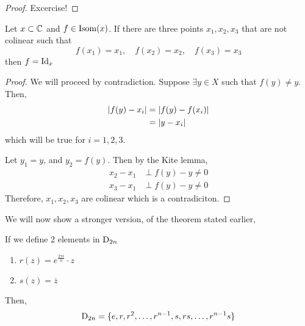 \documentclass{article}
\begin{document}
\begin{proof}
    Excercise!
\end{proof}

\begin{lemma}
    Let $x \subset \mathbb{C}$ and $f \in \operatorname{Isom}(x)$. If there are three points $x_1, x_2, x_3$ that are not colinear such that
    \[
        f(x_1) = x_1, \quad f(x_2) = x_2, \quad f(x_3) = x_3  
    \]
    then $f = \mathrm{Id}_x$
\end{lemma}
\begin{proof}
    We will proceed by contradiction. Suppose $\exists y \in X$ such that $f(y) \neq y$. Then,
    \begin{align*}
        \left\lvert f(y) - x_i\right\rvert &= \left\lvert f(y) - f(x_i)\right\rvert \\
        &= \left\lvert y - x_i\right\rvert
    \end{align*}
    which will be true for $i = 1, 2, 3$.

    Let $y_1 = y$, and $y_2 = f(y)$. Then by the Kite lemma,
    \begin{align*}
        x_2 - x_1 &\perp f(y) - y \neq 0 \\
        x_3 - x_1 &\perp f(y) - y \neq 0
    \end{align*}
    Therefore, $x_1, x_2, x_3$ are colinear which is a contradiciton. \contradiction
\end{proof}

We will now show a stronger version, of the theorem stated earlier,
\begin{thm}[$\abs{\D_{2n}} = 2n$]
    If we define 2 elements in $\mathrm{D}_{2n}$
    \begin{enumerate}
        \item $r(z) = e^\frac{2 \pi i}{n} \cdot z$
        \item $s(z) = \overline{z}$
    \end{enumerate}
    Then,
    \[
        \mathrm{D}_{2n} = \{e, r, r^2, \ldots, r^{n-1}, s, rs, \ldots, r^{n-1}s\}  
    \]
\end{thm}

\end{document}
